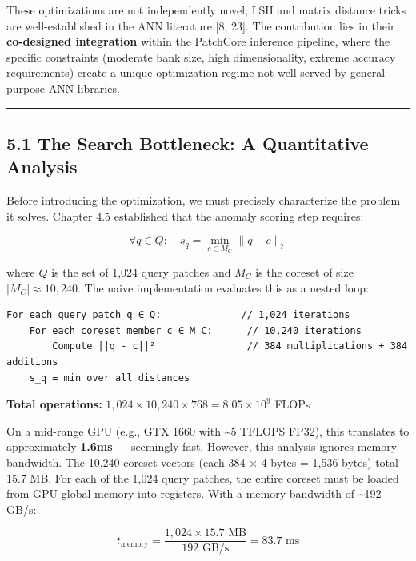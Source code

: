 These optimizations are not independently novel; LSH and matrix distance tricks are well-established in the ANN literature {[}8, 23{]}. The contribution lies in their \textbf{co-designed integration} within the PatchCore inference pipeline, where the specific constraints (moderate bank size, high dimensionality, extreme accuracy requirements) create a unique optimization regime not well-served by general-purpose ANN libraries.

\begin{center}\rule{0.5\linewidth}{0.5pt}\end{center}

\subsection{5.1 The Search Bottleneck: A Quantitative Analysis}\label{the-search-bottleneck-a-quantitative-analysis}

Before introducing the optimization, we must precisely characterize the problem it solves. Chapter 4.5 established that the anomaly scoring step requires:

\[\forall q \in Q: \quad s_q = \min_{c \in M_C} \|q - c\|_2\]

where \(Q\) is the set of 1,024 query patches and \(M_C\) is the coreset of size \(|M_C| \approx 10{,}240\). The naive implementation evaluates this as a nested loop:

\begin{verbatim}
For each query patch q ∈ Q:              // 1,024 iterations
    For each coreset member c ∈ M_C:      // 10,240 iterations
        Compute ||q - c||²                // 384 multiplications + 384 additions
    s_q = min over all distances
\end{verbatim}

\textbf{Total operations:} \(1{,}024 \times 10{,}240 \times 768 = 8.05 \times 10^9\) FLOPs

On a mid-range GPU (e.g., GTX 1660 with \textasciitilde5 TFLOPS FP32), this translates to approximately \textbf{1.6ms} --- seemingly fast. However, this analysis ignores memory bandwidth. The 10,240 coreset vectors (each 384 × 4 bytes = 1,536 bytes) total 15.7 MB. For each of the 1,024 query patches, the entire coreset must be loaded from GPU global memory into registers. With a memory bandwidth of \textasciitilde192 GB/s:

\[t_{\text{memory}} = \frac{1{,}024 \times 15.7 \text{ MB}}{192 \text{ GB/s}} = 83.7 \text{ ms}\]

